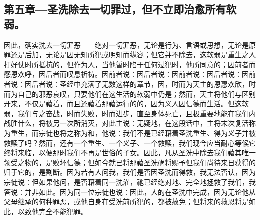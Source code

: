 
\subsection{第五章—圣洗除去一切罪过，但不立即治愈所有软弱。}

因此，确实洗去一切罪恶——绝对一切罪恶，无论是行为、言语或思想，无论是原罪还是后加，无论是因无知所犯或明知而纵容；但它并不除去，这软弱是重生之人打好仗时所抵抗的，但作为人，当他暂时陷于任何过犯时，他所同意的；因前者而感恩欢呼，因后者而叹息祈祷。因前者说：因后者说：因前者说：因后者说：因前者说：因后者说：圣经中充满了无数这样的章节，因，时而为天主的恩惠欢欣，时而为自己的邪恶哀叹，只要他们在这生活的软弱中仍是；然而，天主将他们与区别开来，不仅是藉着，而且还藉着那藉运行的的，因为义人因信德而生活。但这软弱，我们与之奋战，时而失败，时而进步，直至身体死亡，且极重要地能在我们内战胜什么，将被另一次所消灭，对此主说：无疑地，在这段话中，主将末次复活称为重生，而宗徒也将之称为和，他说：我们不是已经藉着圣洗重生、得为义子并被救赎了吗？然而，还有一个重生、一个义子、一个救赎，我们现今应当耐心等候它终将来临，以便那时我们不再是世俗的子女。因此，凡从圣洗中除去我们藉其唯一领受之物的，是败坏信德；但如今就已将那藉圣洗确将赐予但我们尚待来日获得的归于它的，是割断。因为若有人问我，我们是否因圣洗而得救，我无法否认，因为宗徒说：但如果他问，是否藉着同一洗濯，祂已经绝对地、完全地拯救了我们，我答说：并非如此。因为同一位宗徒也说：因此，人的在圣洗中完成，因为无论他从父母继承的何种罪恶，或他自身在受洗前所犯的，都被赦免；但将来的救恩将是如此，以致他完全不能犯罪。\par

